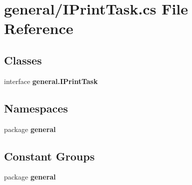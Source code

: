 \section{general/\-I\-Print\-Task.cs File Reference}
\label{_i_print_task_8cs}
\subsection*{Classes}
\begin{DoxyCompactItemize}
\item 
interface {\bf general.\-I\-Print\-Task}
\end{DoxyCompactItemize}
\subsection*{Namespaces}
\begin{DoxyCompactItemize}
\item 
package {\bf general}
\end{DoxyCompactItemize}
\subsection*{Constant Groups}
\begin{DoxyCompactItemize}
\item 
package {\bf general}
\end{DoxyCompactItemize}
